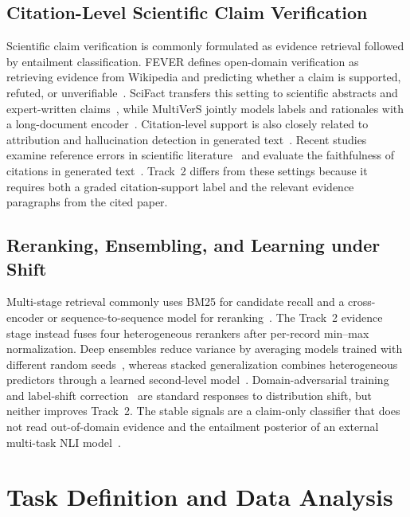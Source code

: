 \documentclass[runningheads]{llncs}
\begin{document}
\subsection{Citation-Level Scientific Claim Verification}
Scientific claim verification is commonly formulated as evidence retrieval followed by entailment classification. FEVER defines open-domain verification as retrieving evidence from Wikipedia and predicting whether a claim is supported, refuted, or unverifiable~\cite{thorne2018fever}. SciFact transfers this setting to scientific abstracts and expert-written claims~\cite{wadden2020scifact}, while MultiVerS jointly models labels and rationales with a long-document encoder~\cite{wadden2022multivers}. Citation-level support is also closely related to attribution and hallucination detection in generated text~\cite{ji2023hallucination,rashkin2023attribution}. Recent studies examine reference errors in scientific literature~\cite{zhang2025referr} and evaluate the faithfulness of citations in generated text~\cite{zhang2024citefaith}. Track~2 differs from these settings because it requires both a graded citation-support label and the relevant evidence paragraphs from the cited paper.

\subsection{Reranking, Ensembling, and Learning under Shift}
Multi-stage retrieval commonly uses BM25 for candidate recall and a cross-encoder or sequence-to-sequence model for reranking~\cite{robertson2009bm25,nogueira2020monot5}. The Track~2 evidence stage instead fuses four heterogeneous rerankers after per-record min--max normalization. Deep ensembles reduce variance by averaging models trained with different random seeds~\cite{lakshminarayanan2017ensembles}, whereas stacked generalization combines heterogeneous predictors through a learned second-level model~\cite{wolpert1992stacked}. Domain-adversarial training~\cite{ganin2016dann} and label-shift correction~\cite{lipton2018bbse} are standard responses to distribution shift, but neither improves Track~2. The stable signals are a claim-only classifier that does not read out-of-domain evidence and the entailment posterior of an external multi-task NLI model~\cite{sileo2024tasksource}.

\section{Task Definition and Data Analysis}
\end{document}
